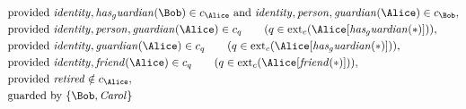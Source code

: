 \begin{align*}
&
\text{provided } 
\mathit{
identity
}
,
\mathit{
has_guardian
}
(
\Bob
)
 \in c_
{
\Alice
}
 \text{ and } 
\mathit{
identity
}
,
\mathit{
person
}
,
\mathit{
guardian
}
(
\Alice
)
 \in c_
{
\Bob
}
,\\
&
\text{provided } 
\mathit{
identity
}
,
\mathit{
person
}
,
\mathit{
guardian
}
(
\Alice
)
 \in c_
q
 \qquad (
q \in 
\mathrm{ext}_c(
\Alice
[
\mathit{
has_guardian
}
(
\ast
)
]
)
)
,\\
&
\text{provided } 
\mathit{
identity
}
,
\mathit{
guardian
}
(
\Alice
)
 \in c_
q
 \qquad (
q \in 
\mathrm{ext}_c(
\Alice
[
\mathit{
has_guardian
}
(
\ast
)
]
)
)
,\\
&
\text{provided } 
\mathit{
identity
}
,
\mathit{
friend
}
(
\Alice
)
 \in c_
q
 \qquad (
q \in 
\mathrm{ext}_c(
\Alice
[
\mathit{
friend
}
(
\ast
)
]
)
)
,\\
&
\text{provided } 
\mathit{
retired
}
 \notin c_
{
\Alice
}
,\\
&
\text{guarded by } \{
\Bob
,
\mathit{Carol}
\}
\end{align*}
